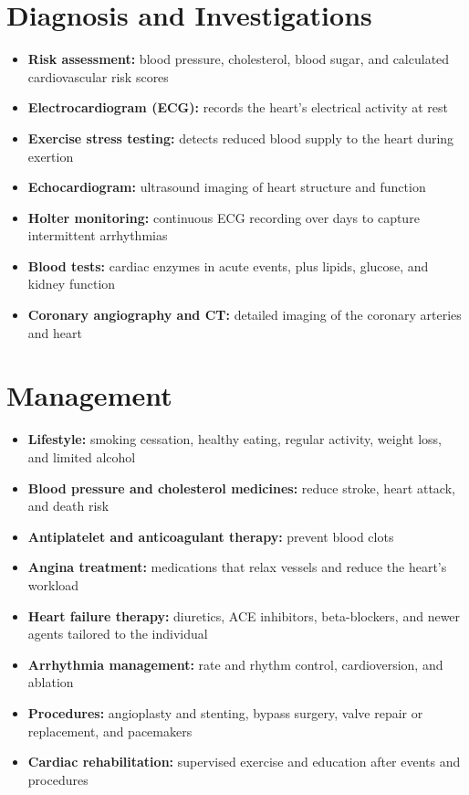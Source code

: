 \section*{Diagnosis and Investigations}
\begin{itemize}
    \item \textbf{Risk assessment:} blood pressure, cholesterol, blood sugar, and calculated cardiovascular risk scores
    \item \textbf{Electrocardiogram (ECG):} records the heart's electrical activity at rest
    \item \textbf{Exercise stress testing:} detects reduced blood supply to the heart during exertion
    \item \textbf{Echocardiogram:} ultrasound imaging of heart structure and function
    \item \textbf{Holter monitoring:} continuous ECG recording over days to capture intermittent arrhythmias
    \item \textbf{Blood tests:} cardiac enzymes in acute events, plus lipids, glucose, and kidney function
    \item \textbf{Coronary angiography and CT:} detailed imaging of the coronary arteries and heart
\end{itemize}

\section*{Management}
\begin{itemize}
    \item \textbf{Lifestyle:} smoking cessation, healthy eating, regular activity, weight loss, and limited alcohol
    \item \textbf{Blood pressure and cholesterol medicines:} reduce stroke, heart attack, and death risk
    \item \textbf{Antiplatelet and anticoagulant therapy:} prevent blood clots
    \item \textbf{Angina treatment:} medications that relax vessels and reduce the heart's workload
    \item \textbf{Heart failure therapy:} diuretics, ACE inhibitors, beta-blockers, and newer agents tailored to the individual
    \item \textbf{Arrhythmia management:} rate and rhythm control, cardioversion, and ablation
    \item \textbf{Procedures:} angioplasty and stenting, bypass surgery, valve repair or replacement, and pacemakers
    \item \textbf{Cardiac rehabilitation:} supervised exercise and education after events and procedures
\end{itemize}

